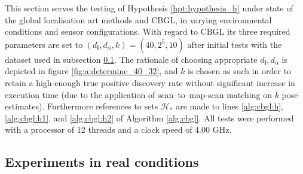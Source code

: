 This section serves the testing of Hypothesis \ref{hpt:hypothesis_h} under
state of the global localisation art methods and CBGL, in varying environmental
conditions and sensor configurations. With regard to CBGL its three required
parameters are set to $(d_{\bm{l}},d_{\alpha},k) = (40, 2^5, 10)$ after
initial tests with the dataset used in subsection \ref{subsec:exp_a}.
The rationale of choosing appropriate $d_{\bm{l}},d_{\alpha}$ is depicted in
figure \ref{fig:a:determine_40_32}, and $k$ is chosen as such in order to
retain a high-enough true positive discovery rate without significant increase
in execution time (due to the application of scan--to--map-scan matching on $k$
pose estimates). Furthermore references to sets $\mathcal{H}_{\ast}$ are made
to lines \ref{alg:cbgl:h}, \ref{alg:cbgl:h1}, and \ref{alg:cbgl:h2} of
Algorithm \ref{alg:cbgl}. All tests were performed with a processor of 12
threads and a clock speed of 4.00 GHz.


\subsection{Experiments in real conditions}
\label{subsec:exp_a}

